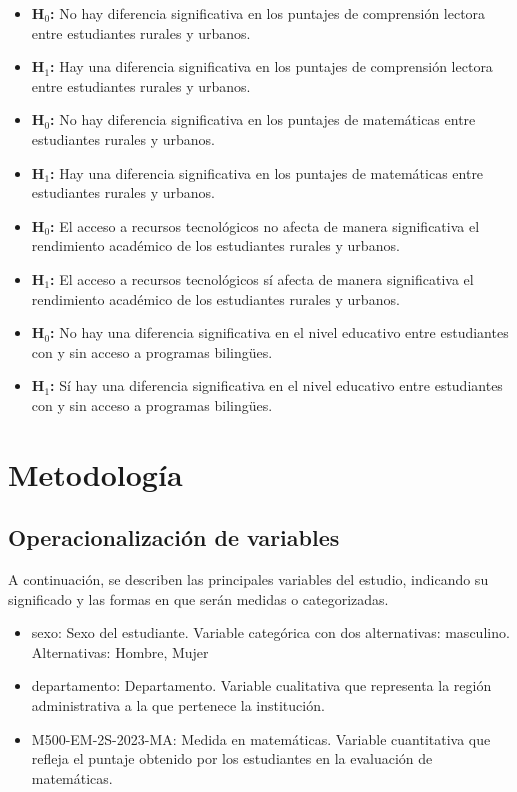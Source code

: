 \documentclass[
]{article}
\begin{document}
\begin{itemize}
    \item \textbf{H$_{0}$:} No hay diferencia significativa en los puntajes de comprensión lectora entre estudiantes rurales y urbanos.
    \item \textbf{H$_{1}$:} Hay una diferencia significativa en los puntajes de comprensión lectora entre estudiantes rurales y urbanos.
    \item \textbf{H$_{0}$:} No hay diferencia significativa en los puntajes de matemáticas entre estudiantes rurales y urbanos.
    \item \textbf{H$_{1}$:} Hay una diferencia significativa en los puntajes de matemáticas entre estudiantes rurales y urbanos.
    \item \textbf{H$_{0}$:} El acceso a recursos tecnológicos no afecta de manera significativa el rendimiento académico de los estudiantes rurales y urbanos.
    \item \textbf{H$_{1}$:} El acceso a recursos tecnológicos sí afecta de manera significativa el rendimiento académico de los estudiantes rurales y urbanos.
    \item \textbf{H$_{0}$:} No hay una diferencia significativa en el nivel educativo entre estudiantes con y sin acceso a programas bilingües.
    \item \textbf{H$_{1}$:} Sí hay una diferencia significativa en el nivel educativo entre estudiantes con y sin acceso a programas bilingües.
\end{itemize}

\section*{Metodología}\label{metodologuxeda}

\subsection*{Operacionalización de
variables}\label{operacionalizaciuxf3n-de-variables}

A continuación, se describen las principales variables del estudio,
indicando su significado y las formas en que serán medidas o
categorizadas.

\begin{itemize}
    \item sexo: Sexo del estudiante. Variable categórica con dos alternativas: masculino. Alternativas: Hombre, Mujer
    \item departamento: Departamento. Variable cualitativa que representa la región administrativa a la que pertenece la institución.
    \item M500-EM-2S-2023-MA: Medida en matemáticas. Variable cuantitativa que refleja el puntaje obtenido por los estudiantes en la evaluación de matemáticas.

\end{itemize}
\end{document}
